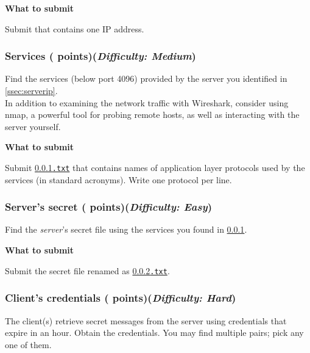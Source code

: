 \smallskip

\hypertarget{cp2serverip}{\textbf{What to submit}\hspace{10pt}}
Submit \texttt{\hyperlink{serveripformat}{\fileserverip}} that contains one IP address.

\subsubsection{Services ( points)\hfill\rm\normalsize (\emph{Difficulty: Medium})}
\label{ssec:protocol}
\newcommand{\fileprotocol}{\ref*{ssec:protocol}.txt}

Find the services (below port 4096) provided by the server you identified in \ref{ssec:serverip}.\\
In addition to examining the network traffic with Wireshark, consider using nmap, a powerful tool for probing remote hosts, as well as interacting with the server yourself.

\smallskip

\hypertarget{cp2protocol}{\textbf{What to submit}\hspace{10pt}}
Submit \texttt{\hyperlink{protocolformat}{\fileprotocol}} that contains names of application layer protocols used by the services (in standard acronyms).
Write one protocol per line.

\subsubsection{Server's secret ( points)\hfill\rm\normalsize (\emph{Difficulty: Easy})}
\label{ssec:priv}
\newcommand{\filepriv}{\ref*{ssec:priv}.txt}

Find the \textit{server}'s secret file using the services you found in \ref{ssec:protocol}.

\smallskip

\hypertarget{cp2priv}{\textbf{What to submit}\hspace{10pt}}
Submit the secret file renamed as \texttt{\hyperlink{privformat}{\filepriv}}.

\pagebreak

\subsubsection{Client's credentials ( points)\hfill\rm\normalsize (\emph{Difficulty: Hard})}
\label{ssec:cred}
\newcommand{\filecred}{\ref*{ssec:cred}.txt}

The client(s) retrieve secret messages from the server using credentials that expire in an hour.
Obtain the credentials.
You may find multiple pairs; pick any one of them.

